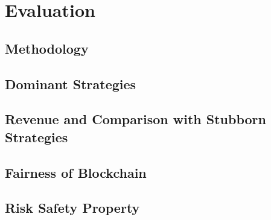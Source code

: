 \chapter{Evaluation}
\label{sec:evaluation}
\minitoc
\vspace*{1cm}

\section{Methodology}

\section{Dominant Strategies}

\section{Revenue and Comparison with Stubborn Strategies}

\section{Fairness of Blockchain}

\section{Risk Safety Property}